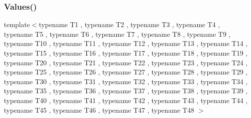 \mbox{\label{namespacetesting_af3cdf373b137d357bb3a814c097bcd06}} 
\subsubsection{\texorpdfstring{Values()}{Values()}\hspace{0.1cm}{\footnotesize\ttfamily [49/51]}}
{\footnotesize\ttfamily template$<$typename T1 , typename T2 , typename T3 , typename T4 , typename T5 , typename T6 , typename T7 , typename T8 , typename T9 , typename T10 , typename T11 , typename T12 , typename T13 , typename T14 , typename T15 , typename T16 , typename T17 , typename T18 , typename T19 , typename T20 , typename T21 , typename T22 , typename T23 , typename T24 , typename T25 , typename T26 , typename T27 , typename T28 , typename T29 , typename T30 , typename T31 , typename T32 , typename T33 , typename T34 , typename T35 , typename T36 , typename T37 , typename T38 , typename T39 , typename T40 , typename T41 , typename T42 , typename T43 , typename T44 , typename T45 , typename T46 , typename T47 , typename T48 $>$ \\
}
